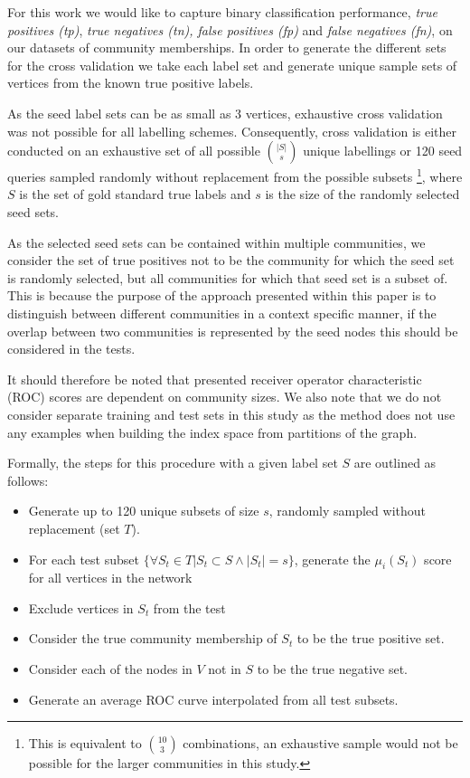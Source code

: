 \documentclass[sigconf]{acmart}
\begin{document}
For this work we would like to capture binary classification  performance, \textit{true positives (tp)}, \textit{true negatives (tn), false positives (fp)} and \textit{false negatives (fn)}, on our datasets of community memberships.
In order to generate the different sets for the cross validation we take each label set and generate unique sample sets of vertices from the known true positive labels.

As the seed label sets can be as small as 3 vertices, exhaustive cross validation was not possible for all labelling schemes.
Consequently, cross validation is either conducted on an exhaustive set of all possible $\binom{|S|}{s}$ unique labellings or 120 seed queries sampled randomly without replacement from the possible subsets \footnote{This is equivalent to $\binom{10}{3}$ combinations, an exhaustive sample would not be possible for the larger communities in this study.}, where $S$ is the set of gold standard true labels and $s$ is the size of the randomly selected seed sets.

As the selected seed sets can be contained within multiple communities, we consider the set of true positives not to be the community for which the seed set is randomly selected, but all communities for which that seed set is a subset of.
This is because the purpose of the approach presented within this paper is to distinguish between different communities in a context specific manner, if the overlap between two communities is represented by the seed nodes this should be considered in the tests.

It should therefore be noted that presented receiver operator characteristic (ROC) scores are dependent on community sizes.
We also note that we do not consider separate training and test sets in this study as the method does not use any examples when building the index space from partitions of the graph.

Formally, the steps for this procedure with a given label set $S$ are outlined as follows:
\begin{itemize}
 \item Generate up to 120 unique subsets of size $s$, randomly sampled without replacement (set $T$).
 \item For each test subset $\{\forall S_t \in T | S_t \subset S \wedge |S_t| = s \}$, generate the $\mu_i(S_t)$ score for all vertices in the network
 \item Exclude vertices in $S_t$ from the test
 \item Consider the true community membership of $S_t$ to be the true positive set.
 \item Consider each of the nodes in $V$ not in $S$ to be the true negative set.
 \item Generate an average ROC curve interpolated from all test subsets.
 \end{itemize}
\end{document}
